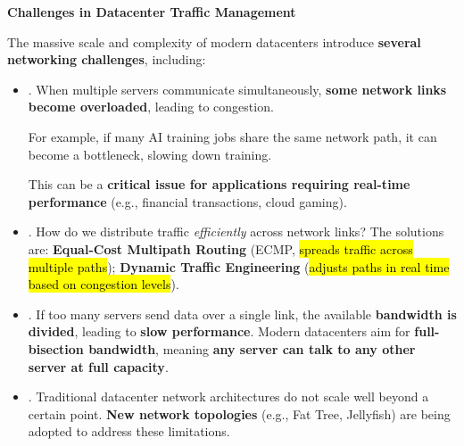 \highspace
\begin{flushleft}
    \textcolor{Green3}{ \textbf{Challenges in Datacenter Traffic Management}}
\end{flushleft}
The massive scale and complexity of modern datacenters introduce \textbf{several networking challenges}, including:  
\begin{itemize}
    \item {}. When multiple servers communicate simultaneously, \textbf{some network links become overloaded}, leading to congestion.

    For example, if many AI training jobs share the same network path, it can become a bottleneck, slowing down training.

    This can be a \textbf{critical issue for applications requiring real-time performance} (e.g., financial transactions, cloud gaming).


    \item {}. How do we distribute traffic \emph{efficiently} across network links? The solutions are: \textbf{Equal-Cost Multipath Routing} (ECMP, \hl{spreads traffic across multiple paths}); \textbf{Dynamic Traffic Engineering} (\hl{adjusts paths in real time based on congestion levels}).


    \item {}. If too many servers send data over a single link, the available \textbf{bandwidth is divided}, leading to \textbf{slow performance}. Modern datacenters aim for \textbf{full-bisection bandwidth}, meaning \textbf{any server can talk to any other server at full capacity}.


    \item {}. Traditional datacenter network architectures do not scale well beyond a certain point. \textbf{New network topologies} (e.g., Fat Tree, Jellyfish) are being adopted to address these limitations.
\end{itemize}

